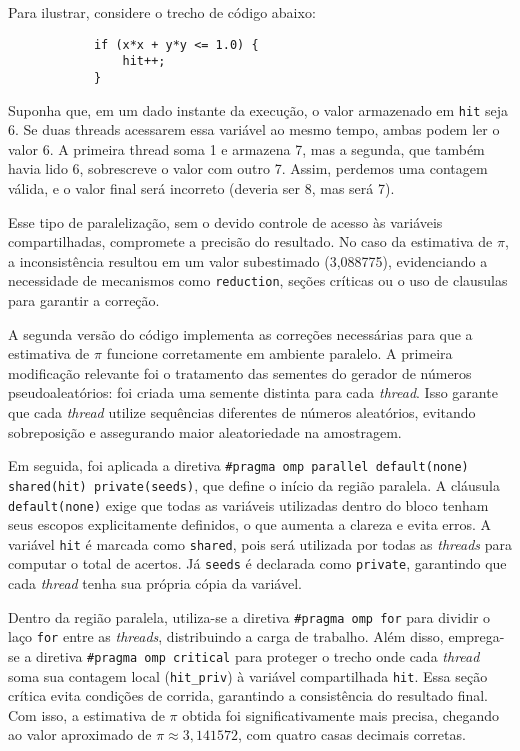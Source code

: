 \documentclass[a4paper, 12pt]{article}
\begin{document}
	Para ilustrar, considere o trecho de código abaixo:
	
	\begin{center}
		\lstset{basicstyle=\ttfamily}
		\begin{lstlisting}
			if (x*x + y*y <= 1.0) {
				hit++;
			}
		\end{lstlisting}
	\end{center}
	
	Suponha que, em um dado instante da execução, o valor armazenado em \texttt{hit} seja 6. Se duas threads acessarem essa variável ao mesmo tempo, ambas podem ler o valor 6. A primeira thread soma 1 e armazena 7, mas a segunda, que também havia lido 6, sobrescreve o valor com outro 7. Assim, perdemos uma contagem válida, e o valor final será incorreto (deveria ser 8, mas será 7).
	
	Esse tipo de paralelização, sem o devido controle de acesso às variáveis compartilhadas, compromete a precisão do resultado. No caso da estimativa de $\pi$, a inconsistência resultou em um valor subestimado (3{,}088775), evidenciando a necessidade de mecanismos como \texttt{reduction}, seções críticas ou o uso de clausulas para garantir a correção.
	
	A segunda versão do código implementa as correções necessárias para que a estimativa de $\pi$ funcione corretamente em ambiente paralelo. A primeira modificação relevante foi o tratamento das sementes do gerador de números pseudoaleatórios: foi criada uma semente distinta para cada \textit{thread}. Isso garante que cada \textit{thread} utilize sequências diferentes de números aleatórios, evitando sobreposição e assegurando maior aleatoriedade na amostragem.
	
	Em seguida, foi aplicada a diretiva \texttt{\#pragma omp parallel default(none) shared(hit) private(seeds)}, que define o início da região paralela. A cláusula \texttt{default(none)} exige que todas as variáveis utilizadas dentro do bloco tenham seus escopos explicitamente definidos, o que aumenta a clareza e evita erros. A variável \texttt{hit} é marcada como \texttt{shared}, pois será utilizada por todas as \textit{threads} para computar o total de acertos. Já \texttt{seeds} é declarada como \texttt{private}, garantindo que cada \textit{thread} tenha sua própria cópia da variável.
	
	Dentro da região paralela, utiliza-se a diretiva \texttt{\#pragma omp for} para dividir o laço \texttt{for} entre as \textit{threads}, distribuindo a carga de trabalho. Além disso, emprega-se a diretiva \texttt{\#pragma omp critical} para proteger o trecho onde cada \textit{thread} soma sua contagem local (\texttt{hit\_priv}) à variável compartilhada \texttt{hit}. Essa seção crítica evita condições de corrida, garantindo a consistência do resultado final. Com isso, a estimativa de $\pi$ obtida foi significativamente mais precisa, chegando ao valor aproximado de $\pi \approx 3{,}141572$, com quatro casas decimais corretas.
	
\end{document}
